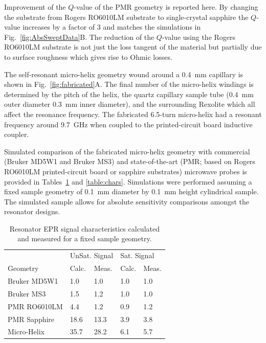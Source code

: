 Improvement of the $Q$-value of the PMR geometry is reported here. By changing the substrate from Rogers RO6010LM substrate to single-crystal sapphire the $Q$-value increases by a factor of 3 and matches the simulations in Fig.~\ref{fig:AbsSweptData}B. The reduction of the $Q$-value using the Rogers RO6010LM substrate is not just the loss tangent of the material but partially due to surface roughness which gives rise to Ohmic losses.

The self-resonant micro-helix geometry wound around a 0.4~mm capillary is shown in Fig.~\ref{fig:fabricated}A. The final number of the micro-helix windings is determined by the pitch of the helix, the quartz capillary sample tube (0.4~mm outer diameter 0.3~mm inner diameter), and the surrounding Rexolite which all affect the resonance frequency. The fabricated 6.5-turn micro-helix had a resonant frequency around 9.7~GHz when coupled to the printed-circuit board inductive coupler. 

Simulated comparison of the fabricated micro-helix geometry with commercial (Bruker MD5W1 and Bruker MS3) and state-of-the-art (PMR; based on Rogers RO6010LM printed-circuit board or sapphire substrates) microwave probes is provided in Tables~\ref{table:signal} and \ref{table:chars}. Simulations were performed assuming a fixed sample geometry of 0.1~mm diameter by 0.1~mm height cylindrical sample. The simulated sample allows for absolute sensitivity comparisons amongst the resonator designs. 

\begin{table}[htb]
\centering
\caption[Resonator EPR signal characteristics calculated and measured.]{Resonator EPR signal characteristics calculated and measured for a fixed sample geometry.}
\label{table:signal}
\begin{tabular}{l|l|l|l|l}
 & \multicolumn{2}{l|}{UnSat. Signal} & \multicolumn{2}{l}{Sat. Signal}\\
Geometry & Calc. & Meas. & Calc. & Meas.\\ \hline \hline
Bruker MD5W1 & 1.0 & 1.0 & 1.0 & 1.0 \\ \hline
Bruker MS3 & 1.5 & 1.2 & 1.0 & 1.0 \\ \hline
PMR RO6010LM & 4.4 & 1.2 & 0.9 & 1.2 \\ \hline
PMR Sapphire & 18.6 & 13.3 & 3.9 & 3.8 \\ \hline
Micro-Helix & 35.7 & 28.2 & 6.1 & 5.7 \\
\end{tabular}
\end{table}

